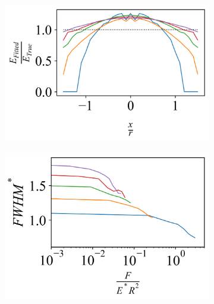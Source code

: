 \begin{figure}[ht]
    
    \begin{subfigure}[t]{0.325\textwidth}
        \centering
        \caption{\label{fig: Hemisphere-Youngs} }
        \includegraphics[width=1\linewidth]{Figures/Hemisphere-Youngs.png} 
    \end{subfigure}
     \hfill
    \begin{subfigure}[t]{0.325\textwidth}
        \centering
        \caption{\label{fig: Hemisphere FWHM} }
        \includegraphics[width=1\linewidth]{Figures/Hemisphere-FWHM.png}
    \end{subfigure}
     \hfill
    \begin{subfigure}[t]{0.325\textwidth}
        \centering
        \caption{\label{fig: Hemisphere-Volume} }

\end{subfigure}
\end{figure}
